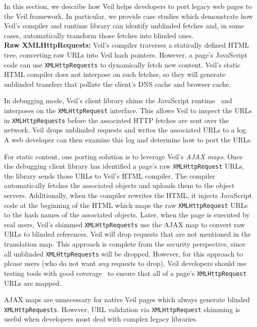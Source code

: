 In this section, we describe how Veil helps developers
to port legacy web pages to the Veil framework. In
particular, we provide case studies which demonstrate
how Veil's compiler and runtime library can identify
unblinded fetches and, in some cases, automatically
transform those fetches into blinded ones.\\

\noindent
{\bf Raw XMLHttpRequests:} Veil's compiler traverses
a statically defined HTML tree, converting raw URLs
into Veil hash pointers. However, a page's JavaScript
code can use \texttt{XMLHttpRequests} to dynamically
fetch new content. Veil's static HTML compiler does
not interpose on such fetches, so they will generate
unblinded transfers that pollute the client's DNS cache
and browser cache.

In debugging mode, Veil's client library shims the
JavaScript runtime~\cite{mugshot} and interposes on
the \texttt{XMLHttpRequest} interface. This allows
Veil to inspect the URLs in \texttt{XMLHttpRequests}
before the associated HTTP fetches are sent over the
network. Veil drops unblinded requests and writes the
associated URLs to a log. A web developer can then
examine this log and determine how to port the URLs.

For static content, one porting solution is to leverage
Veil's \textit{AJAX maps}. Once the debugging client
library has identified a page's raw \texttt{XMLHttpRequest}
URLs, the library sends those URLs to Veil's HTML
compiler. The compiler automatically fetches the associated
objects and uploads them to the object servers. Additionally,
when the compiler rewrites the HTML, it injects
JavaScript code at the beginning of the HTML which maps
the raw \texttt{XMLHttpRequest} URLs to the hash names
of the associated objects. Later, when the page is
executed by real users, Veil's shimmed \texttt{XMLHttpRequests}
use the AJAX map to convert raw URLs to blinded references.
Veil will drop requests that are not mentioned in
the translation map. This approach is complete from
the security perspective, since all unblinded \texttt{XMLHttpRequests}
will be dropped. However, for this approach to please users
(who do not want \textit{any} requests to drop),
Veil developers should use testing tools with good
coverage~\cite{monkeytest,clickmonkey,sahi} to ensure
that all of a page's \texttt{XMLHttpRequest} URLs are
mapped.

AJAX maps are unnecessary for native Veil pages
which always generate blinded \texttt{XMLHttpRequests}.
However, URL validation via \texttt{XMLHttpRequest}
shimming is useful when developers must deal with
complex legacy libraries.\\

